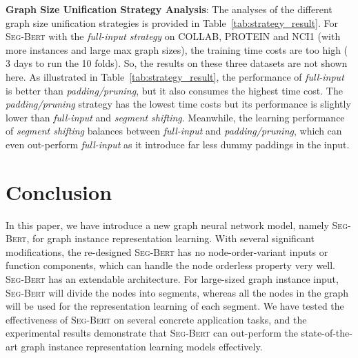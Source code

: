 \documentclass{article}
\newcommand{\our}{\textsc{Seg-Bert}}
\begin{document}
\noindent \textbf{Graph Size Unification Strategy Analysis}: The analyses of the different graph size unification strategies is provided in Table~\ref{tab:strategy_result}. For {\our} with the \textit{full-input strategy} on COLLAB, PROTEIN and NCI1 (with more instances and large max graph sizes), the training time costs are too high ( 3 days to run the 10 folds). So, the results on these three datasets are not shown here. As illustrated in Table~\ref{tab:strategy_result}, the performance of \textit{full-input} is better than \textit{padding/pruning}, but it also consumes the highest time cost. The \textit{padding/pruning} strategy has the lowest time costs but its performance is slightly lower than \textit{full-input} and \textit{segment shifting}. Meanwhile, the learning performance of \textit{segment shifting} balances between \textit{full-input} and \textit{padding/pruning}, which can even out-perform \textit{full-input} as it introduce far less dummy paddings in the input.







































\section{Conclusion}\label{sec:conclusion}

In this paper, we have introduce a new graph neural network model, namely {\our}, for graph instance representation learning. With several significant modifications, the re-designed {\our} has no node-order-variant inputs or function components, which can handle the node orderless property very well. {\our} has an extendable architecture. For large-sized graph instance input, {\our} will divide the nodes into segments, whereas all the nodes in the graph will be used for the representation learning of each segment. We have tested the effectiveness of {\our} on several concrete application tasks, and the experimental results demonstrate that {\our} can out-perform the state-of-the-art graph instance representation learning models effectively.


\end{document}
